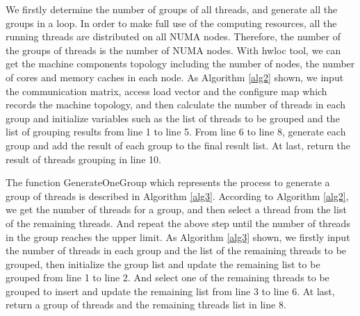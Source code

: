 \documentclass[a4paper,fleqn]{cas-sc}
\begin{document}
We firstly determine the number of groups of all threads, and generate all the groups in a loop. In order to make full use of the computing resources, all the running threads are distributed on all NUMA nodes. Therefore, the number of the groups of threads is the number of NUMA nodes. With hwloc \cite{20} tool, we can get the machine components topology including the number of nodes, the number of cores and memory caches in each node. As Algorithm \ref{alg2} shown, we input the communication matrix, access load vector and the configure map which records the machine topology, and then calculate the number of threads in each group and initialize variables such as the list of threads to be grouped and the list of grouping results from line 1 to line 5. From line 6 to line 8, generate each group and add the result of each group to the final result list. At last, return the result of threads grouping in line 10. 


The function GenerateOneGroup which represents the process to generate a group of threads is described in Algorithm \ref{alg3}. According to Algorithm \ref{alg2}, we get the number of  threads for a group, and then select a thread from the list of the remaining threads. And repeat the above step until the number of threads in the group reaches the upper limit. As Algorithm \ref{alg3} shown, we firstly input the number of threads in each group and the list of the remaining threads to be grouped, then initialize the group list and update the remaining list to be grouped from line 1 to line 2. And select one of the remaining threads to be grouped to insert and update the remaining list from line 3 to line 6. At last, return a group of threads and the remaining threads list in line 8. 
\end{document}
